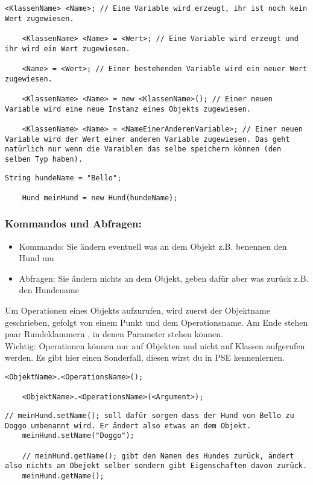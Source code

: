 \begin{lstlisting}[title=\textbf{Variablen Syntax}]
	<KlassenName> <Name>; // Eine Variable wird erzeugt, ihr ist noch kein Wert zugewiesen.

	<KlassenName> <Name> = <Wert>; // Eine Variable wird erzeugt und ihr wird ein Wert zugewiesen.

	<Name> = <Wert>; // Einer bestehenden Variable wird ein neuer Wert zugewiesen.

	<KlassenName> <Name> = new <KlassenName>(); // Einer neuen Variable wird eine neue Instanz eines Objekts zugewiesen.

	<KlassenName> <Name> = <NameEinerAnderenVariable>; // Einer neuen Variable wird der Wert einer anderen Variable zugewiesen. Das geht natürlich nur wenn die Varaiblen das selbe speichern können (den selben Typ haben).
\end{lstlisting}
\begin{lstlisting}[title=\textbf{Variable Beispiel}]
	String hundeName = "Bello";

	Hund meinHund = new Hund(hundeName);
\end{lstlisting}
\begin{Infobox}
	\subsubsection*{Kommandos und Abfragen:}
	\begin{itemize}
		\item Kommando: Sie ändern eventuell was an dem Objekt z.B. benennen den Hund um
		\item Abfragen: Sie ändern nichts an dem Objekt, geben dafür aber was zurück z.B. den Hundename
	\end{itemize}
	Um Operationen eines Objekts aufzurufen, wird zuerst der Objektname geschrieben, gefolgt von einem Punkt und dem Operationsname.
	Am Ende stehen paar Rundeklammern \q{()}, in denen Parameter stehen können.\\
	{\color{red} Wichtig: } Operationen können nur auf Objekten und nicht auf Klassen aufgerufen werden.
	Es gibt hier einen Sonderfall, diesen wirst du in PSE kennenlernen.
\end{Infobox}
\begin{lstlisting}[title=\textbf{Kommando/Abfrage Syntax}]
	<ObjektName>.<OperationsName>();

	<ObjektName>.<OperationsName>(<Argument>);
\end{lstlisting}

\begin{lstlisting}[title=\textbf{Kommando/Abfrage Beispiel}]
	// meinHund.setName(); soll dafür sorgen dass der Hund von Bello zu Doggo umbenannt wird. Er ändert also etwas an dem Objekt.
	meinHund.setName("Doggo");

	// meinHund.getName(); gibt den Namen des Hundes zurück, ändert also nichts am Obejekt selber sondern gibt Eigenschaften davon zurück.
	meinHund.getName();
\end{lstlisting}

